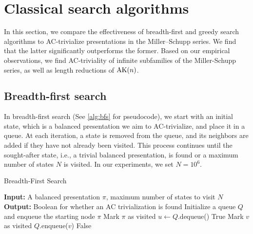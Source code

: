 
\section{Classical search algorithms}\label{sec:search}

In this section, we compare the effectiveness of breadth-first and greedy search algorithms to AC-trivialize presentations in the Miller--Schupp series.
We find that the latter significantly outperforms the former. Based on our empirical observations, we find AC-triviality of infinite subfamilies of the Miller-Schupp series, as well as length reductions of $\text{AK}(n)$. 

\subsection{Breadth-first search}

In breadth-first search (See \autoref{alg:bfs} for pseudocode), we start with an initial state, which is a balanced presentation we aim to AC-trivialize, and place it in a queue. At each iteration, a state is removed from the queue, and its neighbors are added if they have not already been visited. This process continues until the sought-after state, i.e., a trivial balanced presentation, is found or a maximum number of states $N$ is visited. In our experiments, we set $N = 10^6$.

\begin{algorithm}
	\caption{Breadth-First Search}\label{alg:bfs}
	\begin{algorithmic}[1] %
		\State \textbf{Input:} A balanced presentation $\pi$, maximum number of states to visit $N$
		\State \textbf{Output:} Boolean for whether an AC trivialization is found
		\State Initialize a queue $Q$ and enqueue the starting node $\pi$
		\State Mark $\pi$ as visited
		\State $u \gets Q$.dequeue() 
		\State \Return True 
		\EndIf
		\State Mark $v$ as visited
		\State $Q$.enqueue($v$) 
		\EndIf
		\EndFor
		\EndWhile
		\State \Return False 
	\end{algorithmic}
\end{algorithm}

